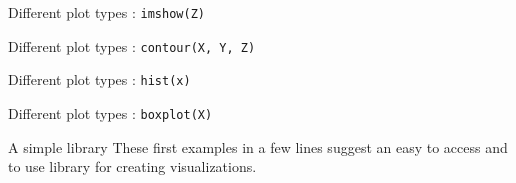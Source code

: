 \begin{frame}{Different plot types : \texttt{imshow(Z)}}
    \begin{minipage}[t]{0.49\linewidth}
    \end{minipage}
    \begin{minipage}[t]{0.49\linewidth}
        \vfill
    \end{minipage}
\end{frame}

\begin{frame}{Different plot types : \texttt{contour(X, Y, Z)}}
    \begin{minipage}[t]{0.49\linewidth}
    \end{minipage}
    \begin{minipage}[t]{0.49\linewidth}
        \vfill
    \end{minipage}
\end{frame}

\begin{frame}{Different plot types : \texttt{hist(x)}}
    \begin{minipage}[t]{0.49\linewidth}
    \end{minipage}
    \begin{minipage}[t]{0.49\linewidth}
        \vfill
    \end{minipage}
\end{frame}

\begin{frame}{Different plot types : \texttt{boxplot(X)}}
    \begin{minipage}[t]{0.49\linewidth}
    \end{minipage}
    \begin{minipage}[t]{0.49\linewidth} 
        \vfill
    \end{minipage}
\end{frame}

\begin{frame}{A simple library }
    These first examples in a few lines suggest an easy to access and to use library for creating visualizations.

\end{frame}

